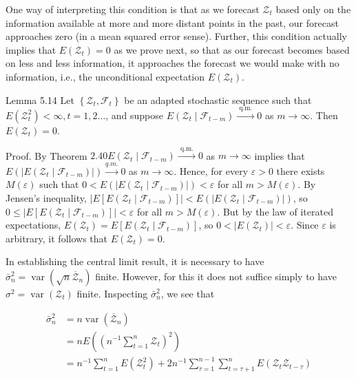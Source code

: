\documentclass[10pt]{article}
\begin{document}
One way of interpreting this condition is that as we forecast $\mathcal{Z}_{t}$ based only on the information available at more and more distant points in the past, our forecast approaches zero (in a mean squared error sense). Further, this condition actually implies that $E\left(\mathcal{Z}_{t}\right)=0$ as we prove next, so that as our forecast becomes based on less and less information, it approaches the forecast we would make with no information, i.e., the unconditional expectation $E\left(\mathcal{Z}_{t}\right)$.

Lemma 5.14 Let $\left\{\mathcal{Z}_{t}, \mathcal{F}_{t}\right\}$ be an adapted stochastic sequence such that $E\left(\mathcal{Z}_{t}^{2}\right)<\infty, t=1,2 \ldots$, and suppose $E\left(\mathcal{Z}_{t} \mid \mathcal{F}_{t-m}\right) \xrightarrow{\text { q.m. }} 0$ as $m \rightarrow \infty$. Then $E\left(\mathcal{Z}_{t}\right)=0$.

Proof. By Theorem $2.40 E\left(\mathcal{Z}_{t} \mid \mathcal{F}_{t-m}\right) \xrightarrow{\text { q.m. }} 0$ as $m \rightarrow \infty$ implies that $E\left(\left|E\left(\mathcal{Z}_{t} \mid \mathcal{F}_{t-m}\right)\right|\right) \xrightarrow{q . m .} 0$ as $m \rightarrow \infty$. Hence, for every $\varepsilon>0$ there exists\\
$M(\varepsilon)$ such that $0<E\left(\left|E\left(\mathcal{Z}_{t} \mid \mathcal{F}_{t-m}\right)\right|\right)<\varepsilon$ for all $m>M(\varepsilon)$. By Jensen's inequality, $\left|E\left[E\left(\mathcal{Z}_{t} \mid \mathcal{F}_{t-m}\right)\right]\right|<E\left(\left|E\left(\mathcal{Z}_{t} \mid \mathcal{F}_{t-m}\right)\right|\right)$, so $0 \leq\left|E\left[E\left(\mathcal{Z}_{t} \mid \mathcal{F}_{t-m}\right)\right]\right|< \varepsilon$ for all $m>M(\varepsilon)$. But by the law of iterated expectations, $E\left(\mathcal{Z}_{t}\right)= E\left[E\left(\mathcal{Z}_{t} \mid \mathcal{F}_{t-m}\right)\right]$, so $0<\left|E\left(\mathcal{Z}_{t}\right)\right|<\varepsilon$. Since $\varepsilon$ is arbitrary, it follows that $E\left(\mathcal{Z}_{t}\right)=0$.

In establishing the central limit result, it is necessary to have $\bar{\sigma}_{n}^{2}= \operatorname{var}\left(\sqrt{n} \overline{\mathcal{Z}}_{n}\right)$ finite. However, for this it does not suffice simply to have $\sigma^{2}= \operatorname{var}\left(\mathcal{Z}_{t}\right)$ finite. Inspecting $\bar{\sigma}_{n}^{2}$, we see that

$$
\begin{aligned}
\bar{\sigma}_{n}^{2} & =n \operatorname{var}\left(\overline{\mathcal{Z}}_{n}\right) \\
& =n E\left(\left(n^{-1} \sum_{t=1}^{n} \mathcal{Z}_{t}\right)^{2}\right) \\
& =n^{-1} \sum_{t=1}^{n} E\left(\mathcal{Z}_{t}^{2}\right)+2 n^{-1} \sum_{\tau=1}^{n-1} \sum_{t=\tau+1}^{n} E\left(\mathcal{Z}_{t} \mathcal{Z}_{t-\tau}\right)
\end{aligned}
$$
\end{document}
